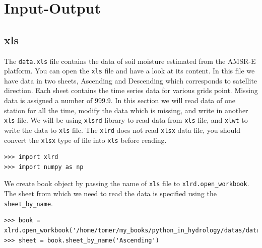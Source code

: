 \documentclass[10pt]{book}
\begin{document}
\chapter{Input-Output}
\section{xls}
The \verb"data.xls" file contains the data of soil moisture estimated from the AMSR-E platform. You can open the \verb"xls" file and have a look at its content. In this file we have data in two sheets, Ascending and Descending which corresponds to satellite direction. Each sheet contains the time series data for various grids point. Missing data is assigned a number of 999.9. In this section we will read data of one station for all the time, modify the data which is missing, and write in another \verb"xls" file. We will be using \verb"xlsrd" library to read data from \verb"xls" file, and \verb"xlwt" to write the data to \verb"xls" file. The \verb"xlrd" does not read \verb"xlsx" data file, you should convert the \verb"xlsx" type of file into \verb"xls" before reading.

\beforeverb \begin{verbatim}
>>> import xlrd
>>> import numpy as np
\end{verbatim} \afterverb

We create book object by passing the name of \verb"xls" file to \verb"xlrd.open_workbook". The sheet from which we need to read the data is specified using the \verb"sheet_by_name".  
\beforeverb \begin{verbatim}
>>> book = xlrd.open_workbook('/home/tomer/my_books/python_in_hydrology/datas/data.xls')
>>> sheet = book.sheet_by_name('Ascending')
\end{verbatim} \afterverb
\end{document}
